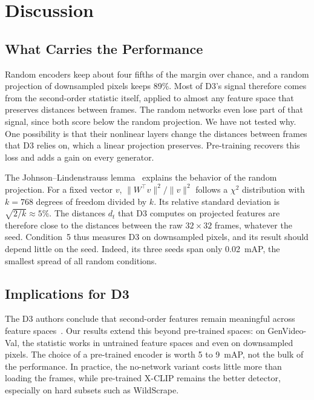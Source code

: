 \documentclass[conference]{IEEEtran}
\begin{document}
\section{Discussion}
\label{sec:discussion}

\subsection{What Carries the Performance}

Random encoders keep about four fifths of the margin over chance, and a random
projection of downsampled pixels keeps 89\%. Most of D3's signal therefore
comes from the second-order statistic itself, applied to almost any feature
space that preserves distances between frames. The random networks even lose
part of that signal, since both score below the random projection. We have not
tested why. One possibility is that their nonlinear layers change the
distances between frames that D3 relies on, which a linear projection
preserves. Pre-training recovers this loss and adds a gain on every
generator.

The Johnson--Lindenstrauss lemma~\cite{johnson1984,achlioptas2003} explains
the behavior of the random projection. For a fixed vector $v$,
$\lVert W^\top v\rVert^2 / \lVert v\rVert^2$ follows a $\chi^2$ distribution
with $k = 768$ degrees of freedom divided by $k$. Its relative standard
deviation is $\sqrt{2/k} \approx 5\%$. The distances $d_t$ that D3 computes on
projected features are therefore close to the distances between the raw
$32\times32$ frames, whatever the seed. Condition~5 thus measures D3 on
downsampled pixels, and its result should depend little on the seed. Indeed,
its three seeds span only 0.02~mAP, the smallest spread of all random
conditions.

\subsection{Implications for D3}

The D3 authors conclude that second-order features remain meaningful across
feature spaces~\cite[Sec.~5.1]{zheng2025d3}. Our results extend this beyond
pre-trained spaces: on GenVideo-Val, the statistic works in untrained feature
spaces and even on downsampled pixels. The choice of a pre-trained encoder is
worth 5 to 9~mAP, not the bulk of the performance. In practice, the
no-network variant costs little more than loading the frames, while
pre-trained X-CLIP remains the better detector, especially on hard subsets
such as WildScrape.
\end{document}
